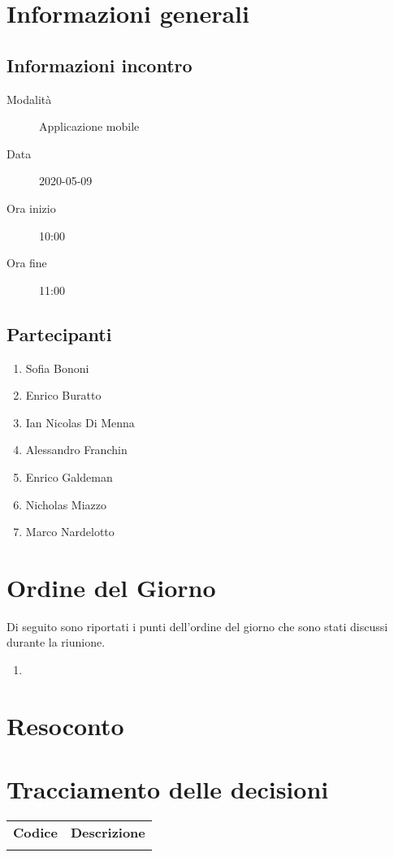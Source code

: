 \documentclass{article}
\begin{document}


\section{Informazioni generali}%
\label{sec:informazioni_generali}

\subsection{Informazioni incontro}%
\label{sub:informazioni_incontro}

\begin{description}
  \item[Modalità] Applicazione mobile 
  \item[Data] 2020-05-09
  \item[Ora inizio] 10:00
  \item[Ora fine] 11:00
\end{description}

\subsection{Partecipanti}%
\label{sub:partecipanti}

\begin{enumerate}
  \item Sofia Bononi
  \item Enrico Buratto
  \item Ian Nicolas Di Menna
  \item Alessandro Franchin
  \item Enrico Galdeman
  \item Nicholas Miazzo
  \item Marco Nardelotto
\end{enumerate}

\section{Ordine del Giorno}%
\label{ordine_del_giorno}
Di seguito sono riportati i punti dell'ordine del giorno che sono stati discussi durante la riunione.
\begin{enumerate}
  \item 
\end{enumerate}

\section{Resoconto}%
\label{resoconto}
\paragraph*{}


\section{Tracciamento delle decisioni}
\begin{table}[H]
  \centering
  \begin{tabular}{p{4cm}|p{12cm}}
    \rowcolor{lightgray}
    \textbf{Codice}  & \textbf{Descrizione}      \\
      &  \\
  \end{tabular}
\end{table}
\end{document}
